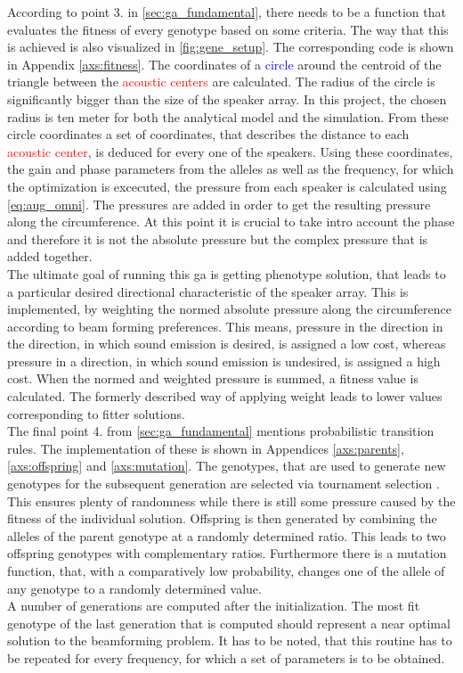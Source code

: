 According to point  3. in \autoref{sec:ga_fundamental}, there needs to be a function that evaluates the fitness of every genotype based on some criteria. The way that this is achieved is also visualized in \autoref{fig:gene_setup}. The corresponding code is shown in Appendix \ref{axs:fitness}. The coordinates of a \textcolor{blue}{circle} around the centroid of the triangle between the \textcolor{red}{acoustic centers} are calculated. The radius of the circle is significantly bigger than the size of the speaker array. In this project, the chosen radius is ten meter for both the analytical model and the simulation. From these circle coordinates a set of coordinates, that describes the distance to each \textcolor{red}{acoustic center}, is deduced for every one of the speakers. Using these coordinates, the gain and phase parameters from the alleles as well as the frequency, for which the optimization is excecuted, the pressure from each speaker is calculated using \autoref{eq:aug_omni}. The pressures are added in order to get the resulting pressure along the circumference. At this point it is crucial to take intro account the phase and therefore it is not the absolute pressure but the complex pressure that is added together.\\
The ultimate goal of running this \gls{ga} is getting phenotype solution, that leads to a particular desired directional characteristic of the speaker array. This is implemented, by weighting the normed absolute pressure along the circumference according to beam forming preferences. This means, pressure in the direction in the direction, in which sound emission is desired, is assigned a low cost, whereas pressure in a direction, in which sound emission is undesired, is assigned a high cost. When the normed and weighted pressure is summed, a fitness value is calculated. The formerly described way of applying weight leads to lower values corresponding to fitter solutions.\\
The final point 4. from \autoref{sec:ga_fundamental} mentions probabilistic transition rules. The implementation of these is shown in Appendices \ref{axs:parents}, \ref{axs:offspring} and \ref{axs:mutation}. The genotypes, that are used to generate new genotypes for the subsequent generation are selected via tournament
selection \citep{tournament}. This ensures plenty of randomness while there is still some pressure caused by the fitness of the individual solution.
Offspring is then generated by combining the alleles of the parent genotype at a randomly determined ratio. This leads to two offspring genotypes with complementary ratios.
Furthermore there is a mutation function, that, with a comparatively low probability, changes one of the allele of any genotype to a randomly determined value.\\
A number of generations are computed after the initialization. The most fit genotype of the last generation that is computed should represent a near optimal solution to the beamforming problem. It has to be noted, that this routine has to be repeated for every frequency, for which a set of parameters is to be obtained.




